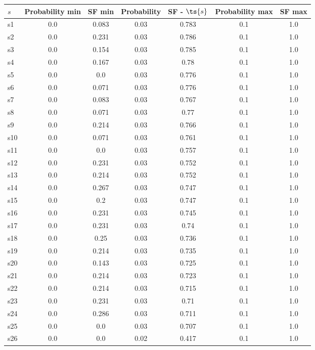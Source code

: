 \documentclass{article}
\begin{document}
\noindent\begin{tabular}{|l|c|c|c|c|c|c|}
\hline
$s$& Probability min & SF min & Probability & SF - $\ts{s}$ & Probability max & SF max\\
\hline
s1 &0.0 & 0.083 & 0.03 & 0.783 & 0.1 & 1.0\\
\hline
s2 &0.0 & 0.231 & 0.03 & 0.786 & 0.1 & 1.0\\
\hline
s3 &0.0 & 0.154 & 0.03 & 0.785 & 0.1 & 1.0\\
\hline
s4 &0.0 & 0.167 & 0.03 & 0.78 & 0.1 & 1.0\\
\hline
s5 &0.0 & 0.0 & 0.03 & 0.776 & 0.1 & 1.0\\
\hline
s6 &0.0 & 0.071 & 0.03 & 0.776 & 0.1 & 1.0\\
\hline
s7 &0.0 & 0.083 & 0.03 & 0.767 & 0.1 & 1.0\\
\hline
s8 &0.0 & 0.071 & 0.03 & 0.77 & 0.1 & 1.0\\
\hline
s9 &0.0 & 0.214 & 0.03 & 0.766 & 0.1 & 1.0\\
\hline
s10 &0.0 & 0.071 & 0.03 & 0.761 & 0.1 & 1.0\\
\hline
s11 &0.0 & 0.0 & 0.03 & 0.757 & 0.1 & 1.0\\
\hline
s12 &0.0 & 0.231 & 0.03 & 0.752 & 0.1 & 1.0\\
\hline
s13 &0.0 & 0.214 & 0.03 & 0.752 & 0.1 & 1.0\\
\hline
s14 &0.0 & 0.267 & 0.03 & 0.747 & 0.1 & 1.0\\
\hline
s15 &0.0 & 0.2 & 0.03 & 0.747 & 0.1 & 1.0\\
\hline
s16 &0.0 & 0.231 & 0.03 & 0.745 & 0.1 & 1.0\\
\hline
s17 &0.0 & 0.231 & 0.03 & 0.74 & 0.1 & 1.0\\
\hline
s18 &0.0 & 0.25 & 0.03 & 0.736 & 0.1 & 1.0\\
\hline
s19 &0.0 & 0.214 & 0.03 & 0.735 & 0.1 & 1.0\\
\hline
s20 &0.0 & 0.143 & 0.03 & 0.725 & 0.1 & 1.0\\
\hline
s21 &0.0 & 0.214 & 0.03 & 0.723 & 0.1 & 1.0\\
\hline
s22 &0.0 & 0.214 & 0.03 & 0.715 & 0.1 & 1.0\\
\hline
s23 &0.0 & 0.231 & 0.03 & 0.71 & 0.1 & 1.0\\
\hline
s24 &0.0 & 0.286 & 0.03 & 0.711 & 0.1 & 1.0\\
\hline
s25 &0.0 & 0.0 & 0.03 & 0.707 & 0.1 & 1.0\\
\hline
s26 &0.0 & 0.0 & 0.02 & 0.417 & 0.1 & 1.0\\

\end{tabular}
\end{document}
